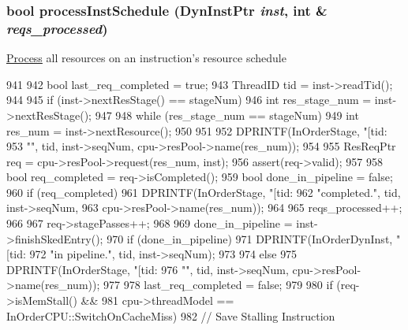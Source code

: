 \hypertarget{classPipelineStage_ac8bd857e45d0b201ea328b6ea8bcb890}{
\subsubsection[{processInstSchedule}]{\setlength{\rightskip}{0pt plus 5cm}bool processInstSchedule ({\bf DynInstPtr} {\em inst}, \/  int \& {\em reqs\_\-processed})}}
\label{classPipelineStage_ac8bd857e45d0b201ea328b6ea8bcb890}
\hyperlink{classProcess}{Process} all resources on an instruction's resource schedule 


\begin{DoxyCode}
941 {
942     bool last_req_completed = true;
943     ThreadID tid = inst->readTid();
944 
945     if (inst->nextResStage() == stageNum) {
946         int res_stage_num = inst->nextResStage();
947 
948         while (res_stage_num == stageNum) {
949             int res_num = inst->nextResource();
950 
951 
952             DPRINTF(InOrderStage, "[tid:%
953                     "\n", tid, inst->seqNum, cpu->resPool->name(res_num));
954 
955             ResReqPtr req = cpu->resPool->request(res_num, inst);
956             assert(req->valid);
957 
958             bool req_completed = req->isCompleted();
959             bool done_in_pipeline = false;
960             if (req_completed) {
961                 DPRINTF(InOrderStage, "[tid:%
962                         "completed.\n", tid, inst->seqNum, 
963                         cpu->resPool->name(res_num));
964 
965                 reqs_processed++;                
966 
967                 req->stagePasses++;                
968 
969                 done_in_pipeline = inst->finishSkedEntry();
970                 if (done_in_pipeline) {
971                     DPRINTF(InOrderDynInst, "[tid:%
972                             "in pipeline.\n", tid, inst->seqNum);
973                 }
974             } else {
975                 DPRINTF(InOrderStage, "[tid:%
976                         "\n", tid, inst->seqNum, cpu->resPool->name(res_num));
977 
978                 last_req_completed = false;
979 
980                 if (req->isMemStall() && 
981                     cpu->threadModel == InOrderCPU::SwitchOnCacheMiss) {
982                     // Save Stalling Instruction
}}}}}
\end{DoxyCode}

